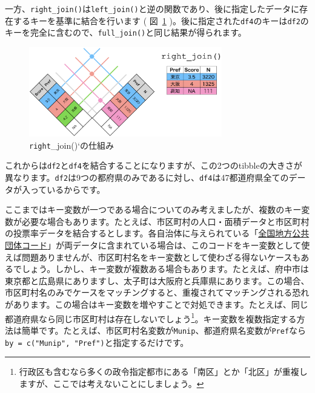 \documentclass[
  a4paper,
  pandoc,
  ja=standard,
  jafont=haranoaji]{bxjsbook}
\begin{document}
一方、\texttt{right\_join()}は\texttt{left\_join()}と逆の関数であり、後に指定したデータに存在するキーを基準に結合を行います
( 図~\ref{fig-handling2_merge_right}
)。後に指定された\texttt{df4}のキーは\texttt{df2}のキーを完全に含むので、\texttt{full\_join()}と同じ結果が得られます。

\begin{figure}

{\centering \includegraphics[width=0.75\textwidth,height=\textheight]{./Figs/Handling2/Merge_Right.png}

}

\caption{\label{fig-handling2_merge_right}\texttt{right}\_join()`の仕組み}

\end{figure}

これからは\texttt{df2}と\texttt{df4}を結合することになりますが、この2つのtibbleの大きさが異なります。\texttt{df2}は9つの都府県のみであるに対し、\texttt{df4}は47都道府県全てのデータが入っているからです。

ここまではキー変数が一つである場合についてのみ考えましたが、複数のキー変数が必要な場合もあります。たとえば、市区町村の人口・面積データと市区町村の投票率データを結合するとします。各自治体に与えられている「\href{https://www.soumu.go.jp/denshijiti/code.html}{全国地方公共団体コード}」が両データに含まれている場合は、このコードをキー変数として使えば問題ありませんが、市区町村名をキー変数として使わざる得ないケースもあるでしょう。しかし、キー変数が複数ある場合もあります。たとえば、府中市は東京都と広島県にありますし、太子町は大阪府と兵庫県にあります。この場合、市区町村名のみでケースをマッチングすると、重複されてマッチングされる恐れがあります。この場合はキー変数を増やすことで対処できます。たとえば、同じ都道府県なら同じ市区町村は存在しないでしょう\footnote{行政区も含むなら多くの政令指定都市にある「南区」とか「北区」が重複しますが、ここでは考えないことにしましょう。}。キー変数を複数指定する方法は簡単です。たとえば、市区町村名変数が\texttt{Munip}、都道府県名変数が\texttt{Pref}なら\texttt{by\ =\ c("Munip",\ "Pref")}と指定するだけです。
\end{document}
